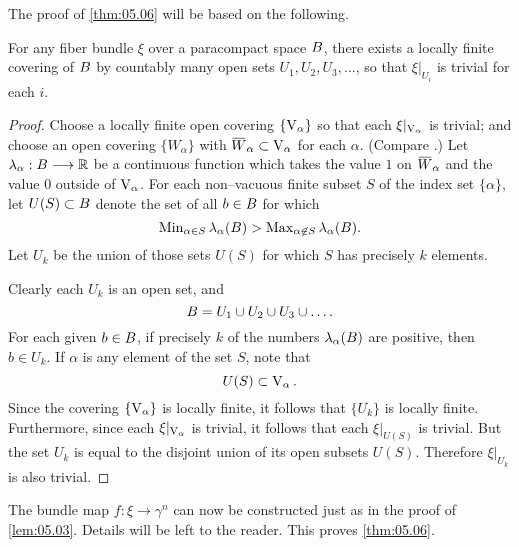 \documentclass[../main]{subfiles}
\begin{document}
The proof of \ref{thm:05.06} will be based on the following.
\setcounter{theorem}{8}
\begin{lemma}
For any fiber bundle $\xi$ over a paracompact space $B$, there exists a locally finite covering of $B$ by countably many open sets $U_1, U_2, U_3, \ldots$, so that $\xi |_{U_i}$ is trivial for each $i$. 
\end{lemma}

\begin{proof}
Choose a locally finite open covering $\{\operatorname{V}_\alpha\}$ so that each $\xi |_{\operatorname{V}_\alpha}$ is trivial; and choose an open covering $\{W_\alpha\}$ with ${\xoverline W}_\alpha \subset \StiefelManifold_\alpha$ for each $\alpha$. (Compare \cite[p. 171]{kelley1955}.) Let $\lambda_\alpha : B \longrightarrow \mathbb R$ be a continuous function which takes the value $1$ on ${\xoverline W}_\alpha$ and the value $0$ outside of $\operatorname{V}_\alpha$. For each non--vacuous finite subset $S$ of the index set $\{\alpha\}$, let $U(S) \subset B$ denote the set of all $b \in B$ for which \[\operatorname{Min}_{\alpha \in S} \lambda_\alpha(B) > \operatorname{Max}_{\alpha \not \in S} \lambda_\alpha(B).\] Let $U_k$ be the union of those sets $U(S)$ for which $S$ has precisely $k$ elements.

Clearly each $U_k$ is an open set, and \[B = U_1 \cup U_2 \cup U_3 \cup \ldots.\] For each given $b \in B$, if precisely $k$ of the numbers $\lambda_\alpha(B)$ are positive, then $b \in U_k$. If $\alpha$ is any element of the set $S$, note that \[U(S) \subset \operatorname{V}_\alpha.\] Since the covering $\{\operatorname{V}_\alpha\}$ is locally finite, it follows that $\{U_k\}$ is locally finite. Furthermore, since each $\xi |_{\operatorname{V}_\alpha}$ is trivial, it follows that each $\xi |_{U(S)}$ is trivial. But the set $U_k$ is equal to the disjoint union of its open subsets $U(S)$. Therefore $\xi |_{U_k}$ is also trivial. 
\end{proof}

The bundle map $f : \xi \longrightarrow \gamma^n$ can now be constructed just as in the proof of \ref{lem:05.03}. Details will be left to the reader. This proves \ref{thm:05.06}. 
\end{document}
